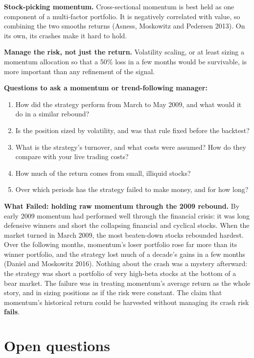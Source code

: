 \textbf{Stock-picking momentum.} Cross-sectional momentum is best held as one component of a multi-factor portfolio. It is negatively correlated with value, so combining the two smooths returns (Asness, Moskowitz and Pedersen 2013). On its own, its crashes make it hard to hold.

\textbf{Manage the risk, not just the return.} Volatility scaling, or at least sizing a momentum allocation so that a 50\% loss in a few months would be survivable, is more important than any refinement of the signal.

\textbf{Questions to ask a momentum or trend-following manager:}

\begin{enumerate}
  \item How did the strategy perform from March to May 2009, and what would it do in a similar rebound?
  \item Is the position sized by volatility, and was that rule fixed before the backtest?
  \item What is the strategy's turnover, and what costs were assumed? How do they compare with your live trading costs?
  \item How much of the return comes from small, illiquid stocks?
  \item Over which periods has the strategy failed to make money, and for how long?
\end{enumerate}

\begin{callout}
\textbf{What Failed: holding raw momentum through the 2009 rebound.} By early 2009 momentum had performed well through the financial crisis: it was long defensive winners and short the collapsing financial and cyclical stocks. When the market turned in March 2009, the most beaten-down stocks rebounded hardest. Over the following months, momentum's loser portfolio rose far more than its winner portfolio, and the strategy lost much of a decade's gains in a few months (Daniel and Moskowitz 2016). Nothing about the crash was a mystery afterward: the strategy was short a portfolio of very high-beta stocks at the bottom of a bear market. The failure was in treating momentum's average return as the whole story, and in sizing positions as if the risk were constant. The claim that momentum's historical return could be harvested without managing its crash risk \textbf{fails}.
\end{callout}

\section{Open questions}
\label{sec:06-open}

